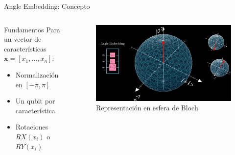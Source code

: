 \documentclass[aspectratio=43]{beamer}
\begin{document}
\begin{frame}{Angle Embedding: Concepto}
  \begin{columns}
    \begin{column}{0.4\textwidth}
      \begin{block}{Fundamentos}
        Para un vector de características $\mathbf{x}=[x_1,\dots,x_n]$:
        \begin{itemize}
          \item Normalización en $[-\pi,\pi]$
          \item Un qubit por característica
          \item Rotaciones $RX(x_i)$ o $RY(x_i)$
        \end{itemize}
      \end{block}
    \end{column}
    \begin{column}{0.6\textwidth}
      \begin{figure}
        \includegraphics[width=\textwidth]{blochh.png}
        \caption{Representación en esfera de Bloch}
      \end{figure}
    \end{column}
  \end{columns}
\end{frame}
\end{document}
